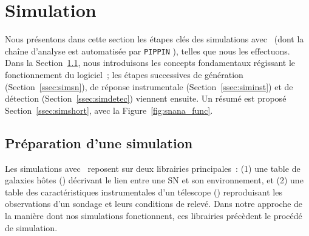\documentclass[../main/main.tex]{subfiles}
\begin{document}
\section{Simulation}\label{sec:snanasim}

Nous présentons dans cette section les étapes clés des simulations avec \snana\
(dont la chaîne d'analyse est automatisée par \texttt{PIPPIN}
\citep{hinton2020}), telles que nous les effectuons. Dans la
Section~\ref{ssec:simprep}, nous introduisons les concepts fondamentaux
régissant le fonctionnement du logiciel~; les étapes successives de génération
(Section~\ref{ssec:simsn}), de réponse instrumentale
(Section~\ref{ssec:siminst}) et de détection (Section~\ref{ssec:simdetec})
viennent ensuite. Un résumé est proposé Section~\ref{ssec:simshort}, avec la
Figure~\ref{fig:snana_func}.

\subsection{Préparation d'une simulation}\label{ssec:simprep}

Les simulations avec \snana\ reposent sur deux librairies principales~: (1) une
table de galaxies hôtes (\hostlib) décrivant le lien entre une SN et son
environnement, et (2) une table des caractéristiques instrumentales d'un
télescope (\simlib) reproduisant les observations d'un sondage et leurs
conditions de relevé. Dans notre approche de la manière dont nos simulations
fonctionnent, ces librairies précèdent le procédé de simulation.

\subsubsection{\hostlib}\label{sssec:hostlib}
\end{document}
